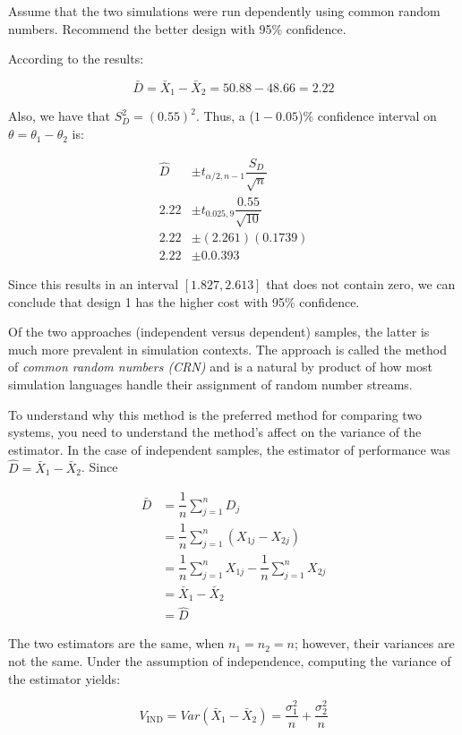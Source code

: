 \documentclass[
]{book}
\theoremstyle{definition}
\theoremstyle{definition}
\theoremstyle{definition}
\theoremstyle{definition}
\theoremstyle{remark}
\begin{document}
Assume that the two simulations were run dependently using common random
numbers. Recommend the better design with 95\% confidence.

According to the results:

\[\bar{D} = \bar{X}_1 - \bar{X}_2 = 50.88 - 48.66 = 2.22\]

Also, we have that \(S_D^2 = (0.55)^2\). Thus, a (\(1 -0.05\))\% confidence
interval on \(\theta = \theta_1 - \theta_2\) is:

\[\begin{aligned}
\hat{D} & \pm t_{\alpha/2, n-1} \dfrac{S_D}{\sqrt{n}}\\
2.22 &  \pm t_{0.025 , 9}  \dfrac{0.55}{\sqrt{10}}\\
2.22 & \pm (2.261)(0.1739)\\
2.22 & \pm 0.0.393\end{aligned}\]

Since this results in an interval \([1.827, 2.613]\) that does not contain
zero, we can conclude that design 1 has the higher cost with 95\%
confidence.

Of the two approaches (independent versus dependent) samples, the latter
is much more prevalent in simulation contexts. The approach is called
the method of \emph{common random numbers (CRN)} and is a natural by product
of how most simulation languages handle their assignment of random
number streams.

To understand why this method is the preferred method for comparing two
systems, you need to understand the method's affect on the variance of
the estimator. In the case of independent samples, the estimator of
performance was \(\hat{D} = \bar{X}_1 - \bar{X}_2\). Since

\[\begin{aligned}
\bar{D} & = \dfrac{1}{n} \sum_{j=1}^n D_j \\
 & =  \dfrac{1}{n} \sum_{j=1}^n (X_{1j} - X_{2j}) \\
 & = \dfrac{1}{n} \sum_{j=1}^n X_{1j} - \dfrac{1}{n} \sum_{j=1}^n X_{2j} \\
 & = \bar{X}_1 - \bar{X}_2 \\
 & = \hat{D}\end{aligned}\]

The two estimators are the same, when \(n_1 = n_2 = n\); however, their
variances are not the same. Under the assumption of independence,
computing the variance of the estimator yields:

\[V_{\text{IND}} = Var(\bar{X}_1 - \bar{X}_2) = \dfrac{\sigma_1^2}{n} + \dfrac{\sigma_2^2}{n}\]
\end{document}
